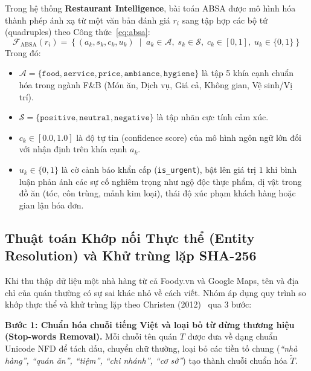 \documentclass[12pt, a4paper]{article}
\begin{document}
Trong hệ thống \textbf{Restaurant Intelligence}, bài toán ABSA được mô hình hóa thành phép ánh xạ từ một văn bản đánh giá $r_i$ sang tập hợp các bộ tứ (quadruples) theo Công thức~\eqref{eq:absa}:
\begin{equation}
\label{eq:absa}
    \mathcal{F}_{\text{ABSA}}(r_i) = \left\{ \left( a_k, s_k, c_k, u_k \right) \;\middle|\; a_k \in \mathcal{A},\; s_k \in \mathcal{S},\; c_k \in [0, 1],\; u_k \in \{0, 1\} \right\}
\end{equation}
Trong đó:
\begin{itemize}[leftmargin=1.2cm]
    \item $\mathcal{A} = \{\texttt{food}, \texttt{service}, \texttt{price}, \texttt{ambiance}, \texttt{hygiene}\}$ là tập 5 khía cạnh chuẩn hóa trong ngành F\&B (Món ăn, Dịch vụ, Giá cả, Không gian, Vệ sinh/Vị trí).
    \item $\mathcal{S} = \{\texttt{positive}, \texttt{neutral}, \texttt{negative}\}$ là tập nhãn cực tính cảm xúc.
    \item $c_k \in [0.0, 1.0]$ là độ tự tin (confidence score) của mô hình ngôn ngữ lớn đối với nhận định trên khía cạnh $a_k$.
    \item $u_k \in \{0, 1\}$ là cờ cảnh báo khẩn cấp (\texttt{is\_urgent}), bật lên giá trị $1$ khi bình luận phản ánh các sự cố nghiêm trọng như ngộ độc thực phẩm, dị vật trong đồ ăn (tóc, côn trùng, mảnh kim loại), thái độ xúc phạm khách hàng hoặc gian lận hóa đơn.
\end{itemize}

\subsection{Thuật toán Khớp nối Thực thể (Entity Resolution) và Khử trùng lặp SHA-256}
Khi thu thập dữ liệu một nhà hàng từ cả Foody.vn và Google Maps, tên và địa chỉ của quán thường có sự sai khác nhỏ về cách viết. Nhóm áp dụng quy trình so khớp thực thể và khử trùng lặp theo Christen (2012)~\cite{christen2012} qua 3 bước:

\textbf{Bước 1: Chuẩn hóa chuỗi tiếng Việt và loại bỏ từ dừng thương hiệu (Stop-words Removal).}
Mỗi chuỗi tên quán $T$ được đưa về dạng chuẩn Unicode NFD để tách dấu, chuyển chữ thường, loại bỏ các tiền tố chung (\textit{``nhà hàng'', ``quán ăn'', ``tiệm'', ``chi nhánh'', ``cơ sở''}) tạo thành chuỗi chuẩn hóa $\tilde{T}$.
\end{document}
